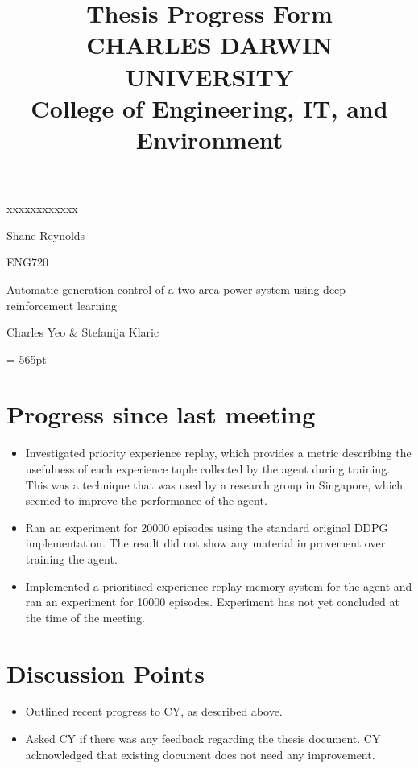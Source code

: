 \documentclass[12pt]{article}
\title{	
		Thesis Progress Form\\
		CHARLES DARWIN UNIVERSITY\\
		College of Engineering, IT, and Environment
	  }
\author{}
\date{}
\begin{document}
	
	\maketitle
	
	\begin{namelist}{xxxxxxxxxxxx}
		\item[{\bf Name:}]
			Shane Reynolds
		\item[{\bf Unit:}]
			ENG720
		\item[{\bf Title:}]
			Automatic generation control of a two area power system using deep reinforcement learning
		\item[{\bf Supervisors:}]
			Charles Yeo \& Stefanija Klaric
		\item[{\bf Time \& Date:} \today \ @ 1pm]
			
	\end{namelist}
	
	\pagestyle{plain} %
	\textheight = 565pt %
	
	\section{Progress since last meeting}
	\begin{itemize}
		\item Investigated priority experience replay, which provides a metric describing the usefulness of each experience tuple collected by the agent during training. This was a technique that was used by a research group in Singapore, which seemed to improve the performance of the agent.
		\item Ran an experiment for 20000 episodes using the standard original DDPG implementation. The result did not show any material improvement over training the agent.
		\item Implemented a prioritised experience replay memory system for the agent and ran an experiment for 10000 episodes. Experiment has not yet concluded at the time of the meeting. 
	\end{itemize}
	\section{Discussion Points}
	\begin{itemize}
		\item Outlined recent progress to CY, as described above.
		\item Asked CY if there was any feedback regarding the thesis document. CY acknowledged that existing document does not need any improvement.
	\end{itemize}
\end{document}
